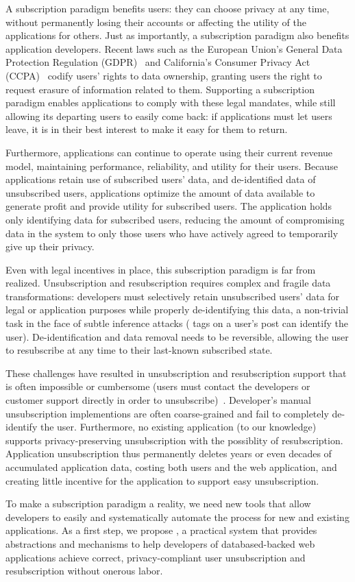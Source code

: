 A subscription paradigm benefits users: they can choose privacy at any time, without
permanently losing their accounts or affecting the utility of the applications for others.  Just as
importantly, a subscription paradigm  also benefits application developers. Recent laws such as the
European Union's General Data Protection Regulation (GDPR)~\cite{eu:gdpr} and California's Consumer
Privacy Act (CCPA)~\cite{ca:privacy-act} codify users' rights to data ownership, granting users the
right to request erasure of information related to them. Supporting a subscription paradigm enables
applications to comply with these legal mandates, while still allowing its departing users to easily
come back: if applications must let users leave, it is in their best interest to make it easy for
them to return.  

Furthermore, applications can continue to operate using their current revenue model, maintaining
performance, reliability, and utility for their users.  Because applications retain use of
subscribed users' data, and de-identified data of unsubscribed users, applications optimize the
amount of data available to generate profit and provide utility for subscribed users. The
application holds only identifying data for subscribed users, reducing the amount of
compromising data in the system to only those users who have actively agreed to temporarily give up
their privacy.

Even with legal incentives in place, this subscription paradigm is far from realized.
Unsubscription and resubscription requires complex and fragile data transformations: 
developers must selectively retain unsubscribed users' data for legal or application purposes while
properly de-identifying this data, a non-trivial task in the face of subtle inference attacks (\eg
tags on a user's post can identify the user). De-identification and data removal needs to be
reversible, allowing the user to resubscribe at any time to their last-known subscribed state.

These challenges have resulted in unsubscription and resubscription support that is often impossible
or cumbersome (users must contact the developers or customer support directly in order to
unsubscribe)~\cite{jdm}.  Developer's manual unsubscription implementions are often coarse-grained
and fail to completely de-identify the user. Furthermore, no existing application (to our knowledge)
supports privacy-preserving unsubscription with the possiblity of resubscription. Application
unsubscription thus permanently deletes years or even decades of accumulated application data,
costing both users and the web application, and creating little incentive for the application to
support easy unsubscription. 

To make a subscription paradigm a reality, we need new tools that allow developers to easily and
systematically automate the process for new and existing applications. As a first step, we propose
\sys, a practical system that provides abstractions and mechanisms to help developers of databased-backed web
applications achieve correct, privacy-compliant user unsubscription and resubscription without
onerous labor.
